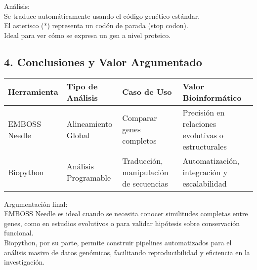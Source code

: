 \documentclass[fleqn,10pt]{article}
\begin{document}
Análisis:\\[0.3em]
Se traduce automáticamente usando el código genético estándar.\\
El asterisco (*) representa un codón de parada (stop codon).\\
Ideal para ver cómo se expresa un gen a nivel proteico.

\subsection*{4. Conclusiones y Valor Argumentado}

\begin{center}
\begin{tabular}{l l l l}
\toprule
Herramienta & Tipo de Análisis & Caso de Uso & Valor Bioinformático \\
\midrule
EMBOSS Needle & Alineamiento Global & Comparar genes completos & Precisión en relaciones evolutivas o estructurales\\
Biopython & Análisis Programable & Traducción, manipulación de secuencias & Automatización, integración y escalabilidad\\
\bottomrule
\end{tabular}
\end{center}

\medskip

Argumentación final:\\[0.3em]
EMBOSS Needle es ideal cuando se necesita conocer similitudes completas entre genes, como en estudios evolutivos o para validar hipótesis sobre conservación funcional.\\[0.3em]
Biopython, por su parte, permite construir pipelines automatizados para el análisis masivo de datos genómicos, facilitando reproducibilidad y eficiencia en la investigación.
\end{document}
